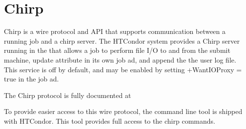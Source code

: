 \section{\label{API-Chirp} Chirp}

Chirp is a wire protocol and API that supports communication between a
running job and a chirp server.  The HTCondor system provides a Chirp
server running in the  that allows a job to perform
file I/O to and from the submit machine, update attribute in its own job
ad, and append the the user log file.  This service is off by default, 
and may be enabled by setting +WantIOProxy = true in the job ad.

The Chirp protocol is fully documented at 

To provide easier access to this wire protocol, the  
command line tool is shipped with HTCondor.  This tool provides full
access to the chirp commands.
